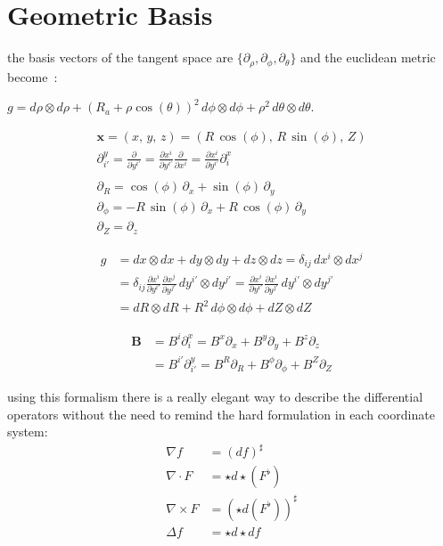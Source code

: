 \appendix

\chapter{Geometric Basis}

the basis vectors of the tangent space are $\{\partial_\rho, \partial_\phi, \partial_\theta\}$ and the euclidean metric become~:

$g = d\rho\otimes d\rho + (R_a+\rho\cos(\theta))^2\, d\phi\otimes d\phi + \rho^2\,d\theta\otimes d\theta $.

\begin{align*}
    \textbf{x} = (x,\,y,\,z) = (R\,\cos(\phi),\,R\,\sin(\phi),\,Z)\\
    \partial_{i'}^y = \frac{\partial}{\partial y^{i'}} = \frac{\partial x^i}{\partial y^{i'}}\frac{\partial}{\partial x^i} = \frac{\partial x^i}{\partial y^{i'}}\partial_i^x\\
    \\
    \partial_R = \cos(\phi)\,\partial_x + \sin(\phi)\,\partial_y\\
    \partial_\phi = -R\,\sin(\phi)\,\partial_x + R\,\cos(\phi)\,\partial_y\\
    \partial_Z = \partial_z
\end{align*}

\begin{align*}
    g &= dx\otimes dx + dy\otimes dy + dz\otimes dz = \delta_{ij}\,dx^i\otimes dx^j\\
    &= \delta_{ij}\frac{\partial x^i}{\partial y^{i'}}\frac{\partial x^j}{\partial y^{j'}}\,dy^{i'}\otimes dy^{j'} = \frac{\partial x^i}{\partial y^{i'}}\frac{\partial x^i}{\partial y^{j'}}\,dy^{i'}\otimes dy^{j'}\\
    &= dR\otimes dR + R^2\,d\phi\otimes d\phi + dZ\otimes dZ
\end{align*}

\begin{align*}
    \textbf{B} &= B^i\partial_i^x = B^x\partial_x + B^y\partial_y + B^z\partial_z\\
     &= B^{i'}\partial_{i'}^y =  B^R\partial_R + B^\phi\partial_\phi + B^Z\partial_Z
\end{align*}

using this formalism there is a really elegant way to describe the differential operators without the need to remind the hard formulation in each coordinate system:
\begin{align*}
    \nabla f &= (df)^\sharp\\
    \nabla\cdot F &= \star d \star (F^\flat)\\
    \nabla\times F &= (\star d (F^\flat))^\sharp\\
    \Delta f &= \star d \star d f\\
\end{align*}


